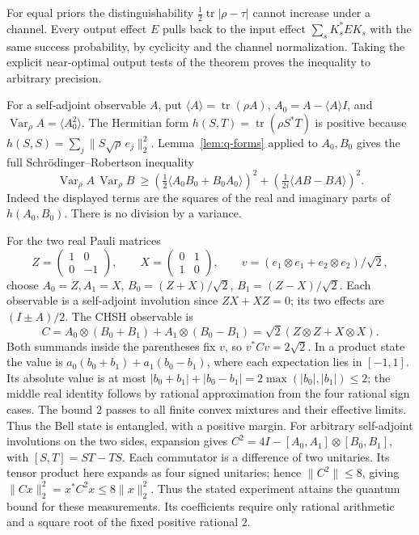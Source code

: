 For equal priors the distinguishability
\(\tfrac12\operatorname{tr}|\rho-\tau|\) cannot increase under a channel.
Every output effect \(E\) pulls back to the input effect
\(\sum_s K_s^*E K_s\) with the same success probability, by cyclicity
and the channel normalization. Taking the explicit near-optimal output
tests of the theorem proves the inequality to arbitrary precision.

For a self-adjoint observable \(A\), put
\(\langle A\rangle=\operatorname{tr}(\rho A)\),
\(A_0=A-\langle A\rangle I\), and
\(\operatorname{Var}_\rho A=\langle A_0^2\rangle\).
The Hermitian form \(h(S,T)=\operatorname{tr}(\rho S^*T)\) is positive
because \(h(S,S)=\sum_j\|S\sqrt\rho\,e_j\|_2^2\).
Lemma~\ref{lem:q-forms} applied to \(A_0,B_0\) gives the full
Schr\"odinger--Robertson inequality
\[
 \operatorname{Var}_\rho A\,\operatorname{Var}_\rho B\ \ge \left(\tfrac12\langle A_0B_0+B_0A_0\rangle\right)^2+
 \left(\tfrac1{2i}\langle AB-BA\rangle\right)^2 .
\]
Indeed the displayed terms are the squares of the real and imaginary
parts of \(h(A_0,B_0)\). There is no division by a variance.

\begin{example}\label{ex:q-bell}
For the two real Pauli matrices
\[
 Z=\begin{pmatrix}1&0\\0&-1\end{pmatrix},\qquad
 X=\begin{pmatrix}0&1\\1&0\end{pmatrix},
 \qquad v=(e_1\otimes e_1+e_2\otimes e_2)/\sqrt2 ,
\]
choose \(A_0=Z,A_1=X\), \(B_0=(Z+X)/\sqrt2\),
\(B_1=(Z-X)/\sqrt2\). Each observable is a self-adjoint involution
since \(ZX+XZ=0\); its two effects are \((I\pm A)/2\).
The CHSH observable is
\[
 C=A_0\otimes(B_0+B_1)+A_1\otimes(B_0-B_1)
   =\sqrt2(Z\otimes Z+X\otimes X).
\]
Both summands inside the parentheses fix \(v\), so \(v^*Cv=2\sqrt2\).
In a product state the value is
\(a_0(b_0+b_1)+a_1(b_0-b_1)\), where each expectation lies in
\([-1,1]\). Its absolute value is at most
\(|b_0+b_1|+|b_0-b_1|=2\max(|b_0|,|b_1|)\le2\);
the middle real identity follows by rational approximation from the
four rational sign cases. The bound \(2\) passes to all finite
convex mixtures and their effective limits. Thus the Bell state is
entangled, with a positive margin. For arbitrary self-adjoint
involutions on the two sides, expansion gives
\(C^2=4I-[A_0,A_1]\otimes[B_0,B_1]\), with
\([S,T]=ST-TS\). Each commutator is a difference of two unitaries.
Its tensor product here expands as four signed unitaries; hence
\(\|C^2\|\le8\), giving \(\|Cx\|_2^2=x^*C^2x\le8\|x\|_2^2\).
Thus the stated experiment attains the quantum bound for these
measurements. Its coefficients require only rational arithmetic and
a square root of the fixed positive rational \(2\).
\end{example}

